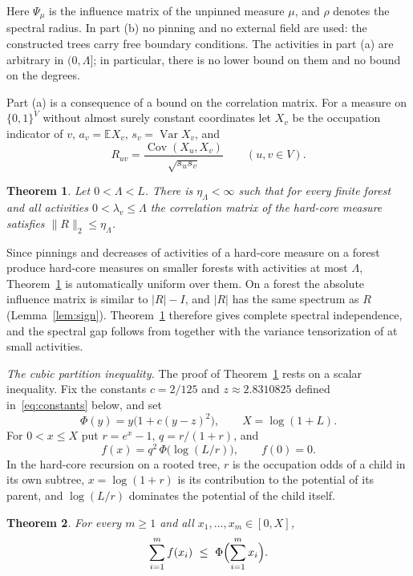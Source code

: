 \documentclass{amsart}
\numberwithin{equation}{section}
\numberwithin{table}{section}
\newtheorem{theorem}{Theorem}[section]
\theoremstyle{definition}
\theoremstyle{remark}
\newcommand{\E}{\mathbb{E}}
\newcommand{\Var}{\operatorname{Var}}
\newcommand{\Cov}{\operatorname{Cov}}
\begin{document}
Here $\Psi_\mu$ is the influence matrix of the unpinned measure $\mu$, and $\rho$ denotes the spectral radius. In part (b) no pinning and no external field are used: the constructed trees carry free boundary conditions. The activities in part (a) are arbitrary in $(0,\Lambda]$; in particular, there is no lower bound on them and no bound on the degrees.

Part (a) is a consequence of a bound on the correlation matrix. For a measure on $\{0,1\}^V$ without almost surely constant coordinates let $X_v$ be the occupation indicator of $v$, $a_v=\E X_v$, $s_v=\Var X_v$, and
\[
R_{uv}=\frac{\Cov(X_u,X_v)}{\sqrt{s_us_v}}\qquad(u,v\in V).
\]

\begin{theorem}\label{thm:corr}
Let $0<\Lambda<L$. There is $\eta_\Lambda<\infty$ such that for every finite forest and all activities $0<\lambda_v\le\Lambda$ the correlation matrix of the hard-core measure satisfies $\|R\|_2\le\eta_\Lambda$.
\end{theorem}

Since pinnings and decreases of activities of a hard-core measure on a forest produce hard-core measures on smaller forests with activities at most $\Lambda$, Theorem~\ref{thm:corr} is automatically uniform over them. On a forest the absolute influence matrix is similar to $|R|-I$, and $|R|$ has the same spectrum as $R$ (Lemma~\ref{lem:sign}). Theorem~\ref{thm:corr} therefore gives complete spectral independence, and the spectral gap follows from \cite[Theorem~1.9]{CFYZ} together with the variance tensorization of \cite[Section~3]{EHSV} at small activities.

\emph{The cubic partition inequality.} The proof of Theorem~\ref{thm:corr} rests on a scalar inequality. Fix the constants $c=2/125$ and $z\approx2.8310825$ defined in~\eqref{eq:constants} below, and set
\begin{equation}\label{eq:Phi-intro}
\Phi(y)=y\bigl(1+c(y-z)^2\bigr),\qquad X=\log(1+L).
\end{equation}
For $0<x\le X$ put $r=e^x-1$, $q=r/(1+r)$, and
\begin{equation}\label{eq:f-intro}
f(x)=q^2\,\Phi\bigl(\log(L/r)\bigr),\qquad f(0)=0.
\end{equation}
In the hard-core recursion on a rooted tree, $r$ is the occupation odds of a child in its own subtree, $x=\log(1+r)$ is its contribution to the potential of its parent, and $\log(L/r)$ dominates the potential of the child itself.

\begin{theorem}\label{thm:partition}
For every $m\ge1$ and all $x_1,\dots,x_m\in[0,X]$,
\[
\sum_{i=1}^m f(x_i)\ \le\ \Phi\Bigl(\sum_{i=1}^m x_i\Bigr).
\]
\end{theorem}
\end{document}
